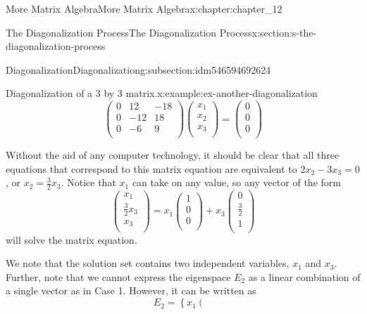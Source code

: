 \documentclass[oneside,10pt,]{book}
\numberwithin{equation}{section}
\begin{document}
\begin{chapterptx}{More Matrix Algebra}{}{More Matrix Algebra}{}{}{x:chapter:chapter_12}
\begin{sectionptx}{The Diagonalization Process}{}{The Diagonalization Process}{}{}{x:section:s-the-diagonalization-process}
\begin{subsectionptx}{Diagonalization}{}{Diagonalization}{}{}{g:subsection:idm546594692624}
\begin{example}{Diagonalization of a 3 by 3 matrix.}{x:example:ex-another-diagonalization}
\begin{equation*}
\left(
\begin{array}{ccc}
0 & 12 & -18 \\
0 & -12 & 18 \\
0 & -6 & 9 \\
\end{array}
\right) \left(
\begin{array}{c}
x_1 \\
x_2 \\
x_3 \\
\end{array}
\right)= \left(
\begin{array}{c}
0 \\
0 \\
0 \\
\end{array}
\right)
\end{equation*}
%
\par
Without the aid of any computer technology, it should be clear that all three equations that correspond to this matrix equation are equivalent to \(2 x_2-3x_3= 0\), or \(x_2= \frac{3}{2}x_3\).    Notice that \(x_1\) can take on any value, so any vector of the form%
\begin{equation*}
\left(
\begin{array}{c}
x_1 \\
\frac{3}{2}x_3 \\
x_3 \\
\end{array}
\right)=x_1\left(
\begin{array}{c}
1 \\
0 \\
0 \\
\end{array}
\right)+x_3\left(
\begin{array}{c}
0 \\
\frac{3}{2} \\
1 \\
\end{array}
\right)
\end{equation*}
will solve the matrix equation.%
\par
We note that the solution set contains two independent variables, \(x_1\) and \(x_3\). Further, note that we cannot express the eigenspace \(E_2\) as a linear combination of a single vector as in Case 1.   However, it can be written as%
\begin{equation*}
E_2= \left\{x_1\left(
\begin{array}{c}

\end{array}
\end{equation*}
\end{example}
\end{subsectionptx}
\end{sectionptx}
\end{chapterptx}
\end{document}
